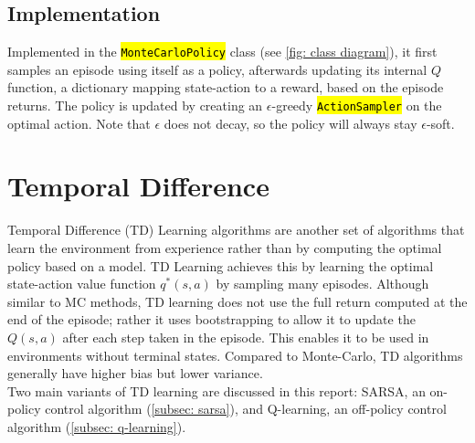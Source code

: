 \documentclass{class}
\def\code#1{\hl{\texttt{#1}}}
\begin{document}
\subsection{Implementation}
Implemented in the \code{MonteCarloPolicy} class (see \autoref{fig: class diagram}), it first samples an episode using itself as a policy, afterwards updating its internal $Q$ function, a dictionary mapping state-action to a reward, based on the episode returns. The policy is updated by creating an $\epsilon$-greedy \code{ActionSampler} on the optimal action. Note that $\epsilon$ does not decay, so the policy will always stay $\epsilon$-soft.

\section{Temporal Difference}
\label{sec: temporal difference}
Temporal Difference (TD) Learning algorithms are another set of algorithms that learn the environment from experience rather than by computing the optimal policy based on a model. TD Learning achieves this by learning the optimal state-action value function $q^*(s, a)$ by sampling many episodes. Although similar to MC methods, TD learning does not use the full return computed at the end of the episode; rather it uses bootstrapping to allow it to update the $Q(s, a)$ after each step taken in the episode. This enables it to be used in environments without terminal states. Compared to Monte-Carlo, TD algorithms generally have higher bias but lower variance. 
\\[0.3cm]
Two main variants of TD learning are discussed in this report: SARSA, an on-policy control algorithm (\autoref{subsec: sarsa}), and Q-learning, an off-policy control algorithm (\autoref{subsec: q-learning}). 
\end{document}
